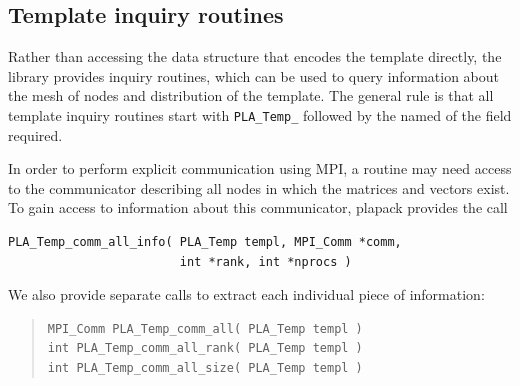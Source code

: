 \subsection{Template inquiry routines}

Rather than accessing the data structure that encodes the template directly,
the library provides inquiry routines, which can be used to query information
about the mesh of nodes and distribution of the template.  The general rule is that
all template inquiry routines start with {\tt PLA\_Temp\_} followed by the named of
the field required.

In order to perform explicit communication using MPI, a routine may need access to
the communicator describing all nodes in which the matrices and vectors exist.
To gain access to information about this communicator, plapack provides the call
\begin{FlaSpec}
\begin{verbatim}
PLA_Temp_comm_all_info( PLA_Temp templ, MPI_Comm *comm, 
                        int *rank, int *nprocs )
\end{verbatim}
\end{FlaSpec}
We also provide separate calls to extract each individual piece of information:
\begin{quote}
\begin{verbatim}
MPI_Comm PLA_Temp_comm_all( PLA_Temp templ )
int PLA_Temp_comm_all_rank( PLA_Temp templ )
int PLA_Temp_comm_all_size( PLA_Temp templ )
\end{verbatim}
\end{quote}

